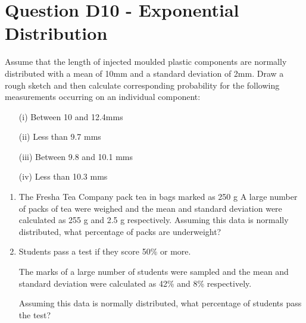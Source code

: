 \documentclass[]{report}
\begin{document}
\section{Question D10 -  Exponential Distribution}



Assume that the length of injected moulded plastic components are normally distributed with a mean of 10mm and a standard deviation of 2mm.  
Draw a rough sketch and then calculate corresponding probability for the following measurements occurring on an individual component:

\begin{itemize} 
	\item[(i)]	Between 10 and 12.4mms
	\item[(ii)]	Less than 9.7 mms
	\item[(iii)]	Between 9.8 and 10.1 mms
	\item[(iv)]	Less than 10.3 mms
\end{itemize}


\begin{enumerate}
	\item The Fresha Tea Company pack tea in bags marked as 250 g
	A large number of packs of tea were weighed and the mean and standard deviation were calculated as 255 g and 2.5 g respectively.
	Assuming this data is normally distributed, what percentage of packs are underweight?
	
	\item Students pass a test if they score 50\% or more.
	
	The marks of a large number of students were sampled and the mean and standard deviation were calculated as 42\% and 8\% respectively.
	
	Assuming this data is normally distributed, what percentage of students pass the test?
	
\end{enumerate}
\end{document}
